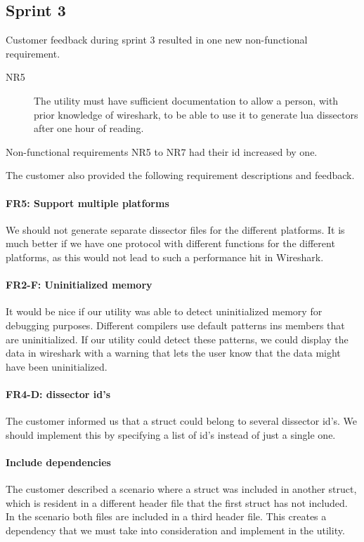 \subsection{Sprint 3}
\label{sec:req:sprint3evo}
Customer feedback during sprint 3 resulted in one new non-functional requirement.
\begin{description}
	\item[NR5] The \gls{utility} must have sufficient documentation to allow a person, with prior knowledge of \Gls{wireshark}, to be able to use it to generate \Gls{lua} \glspl{dissector} after one hour of reading.
\end{description}
Non-functional requirements NR5 to NR7 had their id increased by one.

\noindent The customer also provided the following requirement descriptions
and feedback.
\paragraph{FR5: Support multiple platforms}
We should not generate separate \gls{dissector} files for the different
platforms. It is much better if we have one \gls{protocol} with different
functions for the different platforms, as this would not lead to such a
performance hit in Wireshark.

\paragraph{FR2-F: Uninitialized memory}
It would be nice if our \gls{utility} was able to detect uninitialized memory
for debugging purposes. Different compilers use default patterns ins
\glspl{member} that are uninitialized. If our \gls{utility} could detect these
patterns, we could display the data in \Gls{wireshark} with a warning that
lets the user know that the data might have been uninitialized.

\paragraph{FR4-D: \Gls{dissector} id's}
The customer informed us that a \gls{struct} could belong to several
\gls{dissector} id's. We should implement this by specifying a list of id's
instead of just a single one.

\paragraph{Include dependencies}
The customer described a scenario where a \gls{struct} was included in another
\gls{struct}, which is resident in a different \gls{header} file that the first
\gls{struct} has not included. In the scenario both files are included in a third
\gls{header} file. This creates a dependency that we must take into consideration
and implement in the \gls{utility}.

